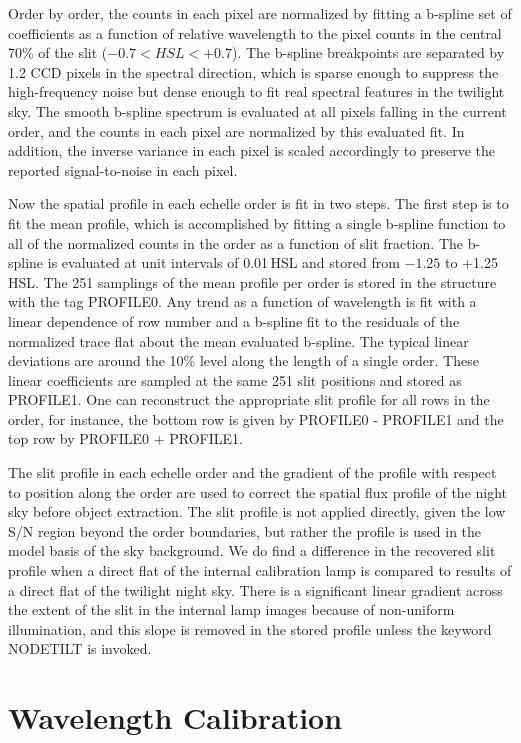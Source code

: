 \documentclass[12pt,preprint]{aastex}
\begin{document}
Order by order, the counts in each pixel are normalized by 
fitting a b-spline set of 
coefficients as a function of relative wavelength to the pixel counts
in the central 70\% of the slit ($-0.7 < HSL < +0.7$).
The b-spline breakpoints are 
separated by 1.2 CCD pixels in the spectral direction, which is sparse enough
to suppress the high-frequency noise but dense enough to fit real 
spectral features in the twilight sky.
The smooth b-spline spectrum is evaluated at all pixels falling in the current
order, and the counts in each pixel are normalized by this evaluated fit.
In addition, the inverse variance in each pixel is scaled accordingly to 
preserve the reported signal-to-noise in each pixel.

Now the spatial profile in each echelle order is fit in two steps.  The first
step is to fit the mean profile, which is accomplished by fitting a single
b-spline function to all of the normalized counts in the order as a function of 
slit fraction.  The b-spline is evaluated at unit intervals of 0.01\,HSL and stored
from $-1.25$ to +1.25\,HSL.  The 251 samplings of the mean profile per order
is stored in the structure with the tag PROFILE0.
Any trend as a function of wavelength is fit with a linear dependence of
row number and a b-spline fit to the residuals of the normalized trace flat
about the mean evaluated b-spline.  The typical linear deviations are 
around the 10\% level along the length of a single order.
These linear coefficients are sampled at the same 251 slit positions and
stored as PROFILE1.  One can reconstruct the appropriate slit profile
for all rows in the order, for instance, the bottom row is given by 
PROFILE0 - PROFILE1 and the top row by PROFILE0 + PROFILE1.

The slit profile in each echelle order 
and the gradient of the profile with respect to position along the order
are used to correct the spatial flux profile of the night sky before 
object extraction.
The slit profile is not applied directly, given the low S/N region beyond 
the order boundaries, but rather the profile is used in the model basis 
of the sky background.  We do find a difference in the recovered slit profile
when a direct flat of the internal calibration lamp is compared
to results of a direct flat of the twilight night sky.  There is a significant
linear gradient across the extent of the slit in the internal lamp images
because of non-uniform illumination, and
this slope is removed in the stored profile unless the keyword 
NODETILT is invoked.


\section{Wavelength Calibration}
\label{sec:wave}
\end{document}

